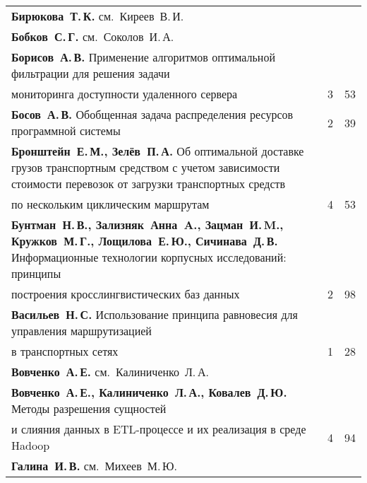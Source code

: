 {\begin{tabular}{p{388pt}rr}
\textbf{Бирюкова~Т.\,К.} см.\ Киреев~В.\,И.&&\\
\textbf{Бобков~С.\,Г.} см.\ Соколов~И.\,А.&&\\
\textbf{Борисов~А.\,В.} Применение алгоритмов оптимальной фильтрации для решения
задачи\linebreak
\vspace*{-12pt}\\
\hspace*{23pt}мониторинга доступности удаленного сервера\dotfill&3&53\\
\textbf{Босов~А.\,В.} Обобщенная задача распределения ресурсов программной
системы\dotfill&2&39\\
\hangindent=23pt\noindent\textbf{Бронштейн~Е.\,М., Зелёв~П.\,А.}
Об оптимальной доставке грузов транспортным средством с учетом зависимости
стоимости перевозок от загрузки транспортных средств\linebreak
\vspace*{-12pt}\\
\hspace*{23pt}по нескольким циклическим маршрутам\dotfill&4&53\\
\hangindent=23pt\noindent\textbf{Бунтман~Н.\,В., Зализняк~Анна~A., Зацман~И.\,M., Кружков~М.\,Г.,
Лощилова~Е.\,Ю., Сичинава~Д.\,В.} Информационные технологии корпусных
исследований: принципы\linebreak
\vspace*{-12pt}\\
\hspace*{23pt}построения кросслингвистических баз данных\dotfill&2&98\\
\textbf{Васильев~Н.\,С.} Использование принципа равновесия для управления
маршрутизацией\linebreak
\vspace*{-12pt}\\
\hspace*{23pt}в транспортных сетях\dotfill&1&28\\
\textbf{Вовченко~А.\,Е.} см.\ Калиниченко~Л.\,А.&&\\
\textbf{Вовченко~А.\,Е., Калиниченко~Л.\,А., Ковалев~Д.\,Ю.} Методы разрешения
сущностей\linebreak
\vspace*{-12pt}\\
\hspace*{23pt}и сли\-яния данных в ETL-процессе и их реализация в среде Hadoop\dotfill&4&94\\
\textbf{Галина~И.\,В.} см.\ Михеев~М.\,Ю.&&\\

\end{tabular}}
